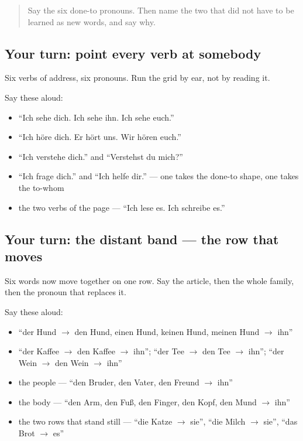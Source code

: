 \label{lesson:GE-R37-mich-dich-sich}



\begin{quote}
Say the six done-to pronouns. Then name the two that did not have to be learned as new words, and say why.
\end{quote}

\subsection*{Your turn: point every verb at somebody}
Six verbs of address, six pronouns. Run the grid by ear, not by reading it.

Say these aloud:

\begin{itemize}
\raggedright
  \item \textquotedblleft{}Ich sehe dich. Ich sehe ihn. Ich sehe euch.\textquotedblright{}
  \item \textquotedblleft{}Ich höre dich. Er hört uns. Wir hören euch.\textquotedblright{}
  \item \textquotedblleft{}Ich verstehe dich.\textquotedblright{} and \textquotedblleft{}Verstehst du mich?\textquotedblright{}
  \item \textquotedblleft{}Ich frage dich.\textquotedblright{} and \textquotedblleft{}Ich helfe dir.\textquotedblright{} — one takes the done-to shape, one takes the to-whom
  \item the two verbs of the page — \textquotedblleft{}Ich lese es. Ich schreibe es.\textquotedblright{}
\end{itemize}

\subsection*{Your turn: the distant band — the row that moves}
Six words now move together on one row. Say the article, then the whole family, then the pronoun that replaces it.

Say these aloud:

\begin{itemize}
\raggedright
  \item \textquotedblleft{}der Hund $\to$ den Hund, einen Hund, keinen Hund, meinen Hund $\to$ ihn\textquotedblright{}
  \item \textquotedblleft{}der Kaffee $\to$ den Kaffee $\to$ ihn\textquotedblright{}; \textquotedblleft{}der Tee $\to$ den Tee $\to$ ihn\textquotedblright{}; \textquotedblleft{}der Wein $\to$ den Wein $\to$ ihn\textquotedblright{}
  \item the people — \textquotedblleft{}den Bruder, den Vater, den Freund $\to$ ihn\textquotedblright{}
  \item the body — \textquotedblleft{}den Arm, den Fuß, den Finger, den Kopf, den Mund $\to$ ihn\textquotedblright{}
  \item the two rows that stand still — \textquotedblleft{}die Katze $\to$ sie\textquotedblright{}, \textquotedblleft{}die Milch $\to$ sie\textquotedblright{}, \textquotedblleft{}das Brot $\to$ es\textquotedblright{}
\end{itemize}

